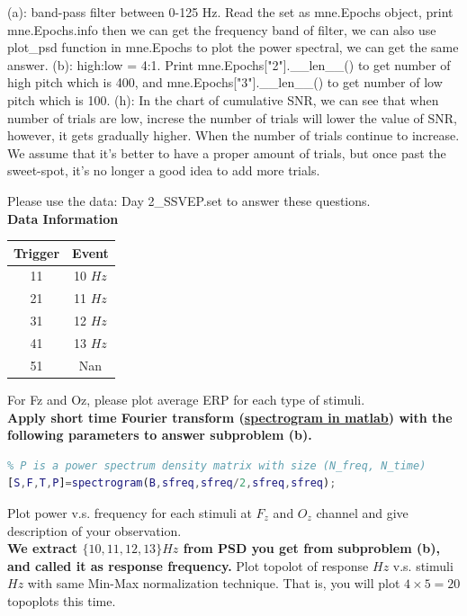 \documentclass[a4 paper]{article}
\begin{document}
\begin{tcolorbox}[colback=YellowGreen!5!white,colframe=YellowGreen!75!black,title={Problem 11's answer}]
(a): band-pass filter between 0-125 Hz.\newline
Read the set as mne.Epochs object, print mne.Epochs.info then we can get the frequency band of filter, we can also use plot\_psd function in mne.Epochs to plot the power spectral, we can get the same answer.\newline
(b): high:low = 4:1.\newline
Print mne.Epochs["2"].\_\_len\_\_() to get number of high pitch which is 400, and  mne.Epochs["3"].\_\_len\_\_() to get number of low pitch which is 100.\newline
(h): In the chart of cumulative SNR, we can see that when number of trials are low, increse the number of trials will lower the value of SNR, however, it gets gradually higher. When the number of trials continue to increase. We assume that it's better to have a proper amount of trials, but once past the sweet-spot, it's no longer a good idea to add more trials.
\end{tcolorbox}
\begin{tcolorbox}[colback=RubineRed!5!white,colframe=RubineRed!75!black]
Please use the data: Day 2\_SSVEP.set to answer these questions.
\\\textbf{Data Information}
\begin{center}
   \begin{tabular}{||c|c||}
    \hline
    Trigger & Event\\
    \hline
     11 & 10 $Hz$ \\
     21 & 11 $Hz$\\
     31 & 12 $Hz$\\
     41 & 13 $Hz$\\
     51 & Nan\\
     \hline
    \end{tabular}
\end{center}
 For Fz and Oz, please plot average ERP for each type of stimuli.
\\\textbf{Apply short time Fourier transform (\href{https://www.mathworks.com/help/signal/ref/spectrogram.html}{spectrogram in matlab}) with the following parameters to answer subproblem (b).} 
\begin{lstlisting}[language=Matlab]
% B: SSVEP for certain channel, sfreq:sampling rate
% P is a power spectrum density matrix with size (N_freq, N_time)
[S,F,T,P]=spectrogram(B,sfreq,sfreq/2,sfreq,sfreq);
\end{lstlisting}
 Plot power v.s. frequency for each stimuli at $F_z$ and $O_z$ channel and give description of your observation.
\\\textbf{We extract $\{10,11,12,13\}Hz$ from PSD you get from subproblem (b), and called it as response frequency.}
 Plot topolot of response $Hz$ v.s. stimuli $Hz$ with same Min-Max normalization technique. That is, you will plot $4\times5=20$ topoplots this time.
\end{tcolorbox}
\end{document}
